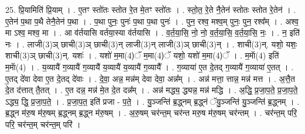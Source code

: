 \documentclass[17pt]{extarticle}
\begin{document}
25. प्रि॒यामिति॑ प्रि॒याम् । . ए॒तꣳ स्तो॑तः स्तोत रे॒त मे॒तꣳ स्तो॑तः । . स्तो॒त॒ रे॒ते नै॒तेन॑ स्तोतः स्तोत रे॒तेन॑ । . ए॒तेन॑ प॒था प॒थै तेनै॒तेन॑ प॒था । . प॒था पुनः॒ पुनः॑ प॒था प॒था पुनः॑ । . पुन॒ रश्व॒ मश्व॒म् पुनः॒ पुन॒ रश्व᳚म् । . अश्व॒ मा ऽश्व॒ मश्व॒ मा । . आ व॑र्तयासि वर्तया॒स्या व॑र्तयासि । . व॒र्त॒या॒सि॒ नो॒ नो॒ व॒र्त॒या॒सि॒ व॒र्त॒या॒सि॒ नः॒ । . न॒ इति॑ नः । . लाजी(3)ञ् छाची(3)ञ् छाची(3)न् लाजी(3)न् लाजी(3)ञ् छाची(3)न् । . शाची(3)न्. यशो॒ यशः॒ शाची(3)ञ् छाची(3)न्. यशः॑ । . यशो॑ म॒मा(4)ॅ म॒मा(4)ॅ यशो॒ यशो॑ म॒मा(4)ॅ । . म॒माॅ(4) इति॑ म॒माॅ(4) । . य॒व्यायै॑ ग॒व्यायै॑ ग॒व्यायै॑ य॒व्यायै॑ य॒व्यायै॑ ग॒व्यायै᳚ । . ग॒व्याया॑ ए॒त दे॒तद् ग॒व्यायै॑ ग॒व्याया॑ ए॒तत् । . ए॒तद् दे॑वा देवा ए॒त दे॒तद् दे॑वाः । . दे॒वा॒ अन्न॒ मन्न॑म् देवा देवा॒ अन्न᳚म् । . अन्न॑ मत्ता॒ त्तान्न॒ मन्न॑ मत्त । . अ॒त्तै॒त दे॒त द॑त्तात् तै॒तत् । . ए॒त दन्न॒ मन्न॑ मे॒त दे॒त दन्न᳚म् । . अन्न॑ मद्ध्य॒ द्ध्यन्न॒ मन्न॑ मद्धि । . अ॒द्धि॒ प्र॒जा॒प॒ते॒ प्र॒जा॒प॒ते॒ ऽद्ध्य॒ द्धि॒ प्र॒जा॒प॒ते॒ । . प्र॒जा॒प॒त॒ इति॑ प्रजा - प॒ते॒ । . यु॒ञ्जन्ति॑ ब्र॒द्ध्नम् ब्र॒द्ध्नं ॅयु॒ञ्जन्ति॑ यु॒ञ्जन्ति॑ ब्र॒द्ध्नम् । . ब्र॒द्ध्न म॑रु॒ष म॑रु॒षम् ब्र॒द्ध्नम् ब्र॒द्ध्न म॑रु॒षम् । . अ॒रु॒षम् चर॑न्त॒म् चर॑न्त मरु॒ष म॑रु॒षम् चर॑न्तम् । . चर॑न्त॒म् परि॒ परि॒ चर॑न्त॒म् चर॑न्त॒म् परि॑ । \newline
\end{document}
